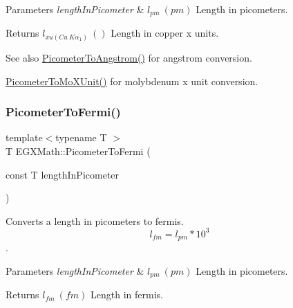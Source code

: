 \begin{DoxyParams}{Parameters}
{\em length\+In\+Picometer} & $ l_{pm}\ (pm)$ Length in picometers. \\
\hline
\end{DoxyParams}
\begin{DoxyReturn}{Returns}
$ l_{xu(Cu\ K\alpha_1)}\ ()$ Length in copper x units. 
\end{DoxyReturn}
\begin{DoxySeeAlso}{See also}
\mbox{\hyperlink{group___e_g_x_math-_conversions-_length_conversions-_s_i-_picometer-_non-_s_i_ga0b1b4a3ec4ea0110477f4547025d2719}{Picometer\+To\+Angstrom()}} for angstrom conversion. 

\mbox{\hyperlink{group___e_g_x_math-_conversions-_length_conversions-_s_i-_picometer-_non-_s_i_ga51b96b4bb30b7e9c971db81ff89a82f8}{Picometer\+To\+Mo\+X\+Unit()}} for molybdenum x unit conversion. 
\end{DoxySeeAlso}
\mbox{\label{group___e_g_x_math-_conversions-_length_conversions-_s_i-_picometer-_non-_s_i_ga13ec47b0b50eca30313bb7902a28f0c9}} 
\subsubsection{\texorpdfstring{Picometer\+To\+Fermi()}{PicometerToFermi()}}
{\footnotesize\ttfamily template$<$typename T $>$ \\
T E\+G\+X\+Math\+::\+Picometer\+To\+Fermi (\begin{DoxyParamCaption}\item[{const T}]{length\+In\+Picometer }\end{DoxyParamCaption})}



Converts a length in picometers to fermis. \[ l_{fm}=l_{pm} * 10^{3} \]. 


\begin{DoxyParams}{Parameters}
{\em length\+In\+Picometer} & $ l_{pm}\ (pm)$ Length in picometers. \\
\hline
\end{DoxyParams}
\begin{DoxyReturn}{Returns}
$ l_{fm}\ (fm)$ Length in fermis. 
\end{DoxyReturn}
\mbox{\label{group___e_g_x_math-_conversions-_length_conversions-_s_i-_picometer-_non-_s_i_gad8fddabe74b111596888c370081f725e}} 
